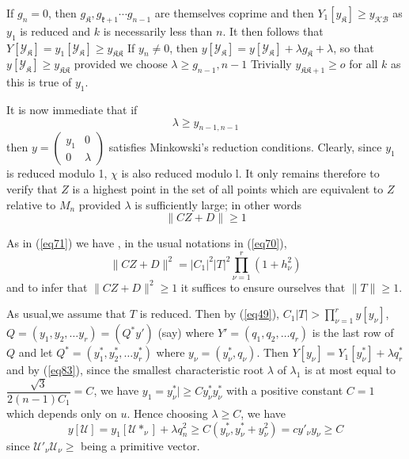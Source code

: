  If $g_n =0$, then  $g_{\mathfrak{K}}, g_{\mathfrak{k}+1} \cdots
 g_{n-1}$ are themselves coprime and then $Y_1[y_\mathfrak{K}] \ge y_{\mathscr{K}
   \mathscr{B}}$ as $y_1$ is reduced and $k$ is necessarily less than
 $n$. It then follows that
 $Y[\mathscr{Y}_{\mathfrak{K}}]=y_1[\mathscr{Y}_{\mathfrak{K}}] \ge
 y_{\mathfrak{K} \mathfrak{K}}$ If $y_n \neq 0$, then
 $y[\mathscr{Y}_{\mathfrak{K}}]=y[\mathscr{Y}_{\mathfrak{K}}]+ \lambda
 g_{\mathfrak{K}} +\lambda $, so that $y[\mathscr{Y}_{\mathfrak{K}}] \ge
 y_{\mathfrak{K}\mathfrak{K}}$ provided we choose $\lambda \ge g_{n-1},
 n-1$ Trivially $y_{\mathfrak{K}\mathfrak{K}+1} \ge o$ for all $k$ as
 this is true of  $y_1$. 
 
 It is now immediate that if  
 \begin{equation*}
\lambda \ge y_{n-1, n-1} \tag{104}\label{eq104}
 \end{equation*} 
 then $y= \begin{pmatrix} y_1 &0 \\ 0 & \lambda \end{pmatrix}$
 satisfies Minkowski's reduction conditions. Clearly, since  $y_1$ is
 reduced modulo 1, $\chi$ is also reduced modulo l. It only remains
 therefore to verify that $Z$ is a highest point in the set of all
 points which are equivalent to $Z$ relative to $M_n$ provided $\lambda$
 is sufficiently large; in other words  
 $$
 \| CZ + D\| \ge 1
 $$
 
 As in (\ref{eq71}) we have , in the usual  notations in (\ref{eq70}), 
 $$
 \| CZ+D\|^2= |C_1|^2 |T|^2 \prod\limits^r_{\nu=1} (1+h^2_\nu)
 $$
 and to infer that $\| CZ +D \|^2 \ge 1$  it suffices to ensure
 ourselves that $\| T \| \ge 1$.   

As usual,\pageoriginale we assume that $T$ is reduced. Then by
(\ref{eq49}), $C_1|T|> 
\prod\limits^r_{\nu=1} y [y_\nu]$, $Q = (y_1, y_2, \ldots y_r) =
(Q^\ast y')$
(say) where $Y' = (q_1, q_2, \ldots q_r)$ is the last row of $Q$ and
let $Q^\ast = (y^\ast_1, y^\ast_2, \ldots y^\ast_r)$ where 
$y_\nu = (y^\ast_\nu, q_\nu) $. Then $Y [y_\nu] = Y_1 [y^\ast_\nu] +
\lambda q^\ast_r$ and by (\ref{eq83}), since the smallest
characteristic root $\lambda$ 
of $\lambda_1$ is at most equal to $\dfrac{\sqrt{3}}{2(n-1) C_1} = C$,
we have $y_1 = y^\ast_\nu | \geq C y^\ast_\nu y^\ast_\nu$ with a 
positive constant $C = 1$ which depends only on $u$. Hence choosing
$\lambda \geq C$, we have  
$$
y [\mathscr{U}] = y_1 [\mathscr{U}*_\nu] + \lambda q^2_n \geq
C (y^\ast_\nu, y^\ast_\nu + y^2_\nu) = c y'_\nu y_\nu \geq C
$$ 
since $\mathscr{U}'_\nu \mathscr{U}_\nu \geq$ being a primitive vector.

